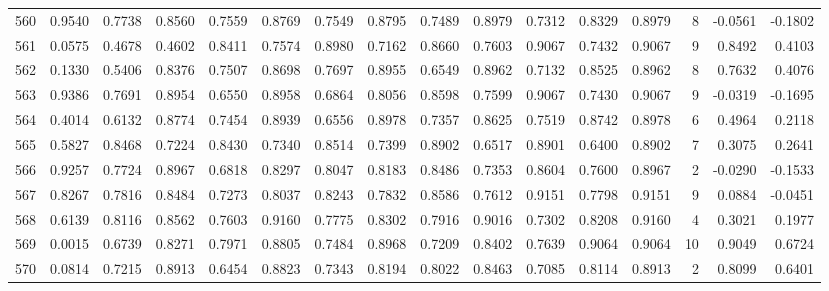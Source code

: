 \begin{tabular}{lrrrrrrrrrrrrrrr}
560 &      0.9540 &  0.7738 &  0.8560 &  0.7559 &  0.8769 &  0.7549 &  0.8795 &  0.7489 &  0.8979 &  0.7312 &   0.8329 &     0.8979 &      8 &                   -0.0561 &                    -0.1802 \\
561 &      0.0575 &  0.4678 &  0.4602 &  0.8411 &  0.7574 &  0.8980 &  0.7162 &  0.8660 &  0.7603 &  0.9067 &   0.7432 &     0.9067 &      9 &                    0.8492 &                     0.4103 \\
562 &      0.1330 &  0.5406 &  0.8376 &  0.7507 &  0.8698 &  0.7697 &  0.8955 &  0.6549 &  0.8962 &  0.7132 &   0.8525 &     0.8962 &      8 &                    0.7632 &                     0.4076 \\
563 &      0.9386 &  0.7691 &  0.8954 &  0.6550 &  0.8958 &  0.6864 &  0.8056 &  0.8598 &  0.7599 &  0.9067 &   0.7430 &     0.9067 &      9 &                   -0.0319 &                    -0.1695 \\
564 &      0.4014 &  0.6132 &  0.8774 &  0.7454 &  0.8939 &  0.6556 &  0.8978 &  0.7357 &  0.8625 &  0.7519 &   0.8742 &     0.8978 &      6 &                    0.4964 &                     0.2118 \\
565 &      0.5827 &  0.8468 &  0.7224 &  0.8430 &  0.7340 &  0.8514 &  0.7399 &  0.8902 &  0.6517 &  0.8901 &   0.6400 &     0.8902 &      7 &                    0.3075 &                     0.2641 \\
566 &      0.9257 &  0.7724 &  0.8967 &  0.6818 &  0.8297 &  0.8047 &  0.8183 &  0.8486 &  0.7353 &  0.8604 &   0.7600 &     0.8967 &      2 &                   -0.0290 &                    -0.1533 \\
567 &      0.8267 &  0.7816 &  0.8484 &  0.7273 &  0.8037 &  0.8243 &  0.7832 &  0.8586 &  0.7612 &  0.9151 &   0.7798 &     0.9151 &      9 &                    0.0884 &                    -0.0451 \\
568 &      0.6139 &  0.8116 &  0.8562 &  0.7603 &  0.9160 &  0.7775 &  0.8302 &  0.7916 &  0.9016 &  0.7302 &   0.8208 &     0.9160 &      4 &                    0.3021 &                     0.1977 \\
569 &      0.0015 &  0.6739 &  0.8271 &  0.7971 &  0.8805 &  0.7484 &  0.8968 &  0.7209 &  0.8402 &  0.7639 &   0.9064 &     0.9064 &     10 &                    0.9049 &                     0.6724 \\
570 &      0.0814 &  0.7215 &  0.8913 &  0.6454 &  0.8823 &  0.7343 &  0.8194 &  0.8022 &  0.8463 &  0.7085 &   0.8114 &     0.8913 &      2 &                    0.8099 &                     0.6401 \\

\end{tabular}
